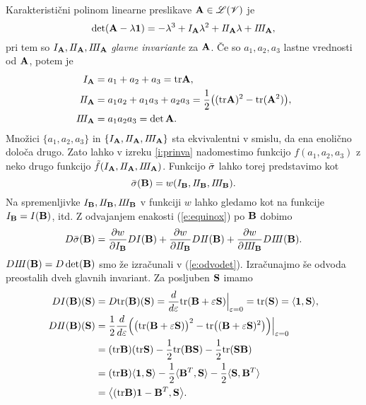 Karakteristični polinom linearne preslikave $\mathbf A\in\mathscr L(\mathscr V)$ je
\[
	\det(\mathbf A-\lambda\mathbf 1)=-\lambda^3+I_{\mathbf A}\lambda^2+I\! I_{\mathbf A}\lambda+I\! I\! I_{\mathbf A},
\]
pri tem so $I_{\mathbf A}, I\! I_{\mathbf A}, I\! I\! I_{\mathbf A}$ \emph{glavne invariante} za $\mathbf A$.
Če so $a_1,a_2,a_3$ lastne vrednosti od $\mathbf A$, potem je
\begin{align*}
	I_{\mathbf A}&=a_1+a_2+a_3=\mathrm{tr}\mathbf A,\\
	I\! I_{\mathbf A}&=a_1a_2+a_1a_3+a_2a_3=\frac{1}{2}\big((\mathrm{tr}\mathbf A)^2-\mathrm{tr}(\mathbf A^2)\big),\\
	I\! I\! I_{\mathbf A}&=a_1a_2a_3=\det\mathbf A.
\end{align*}
Množici $\{a_1,a_2,a_3\}$ in $\{I_{\mathbf A},I\! I_{\mathbf A},I\! I\! I_{\mathbf A}\}$ sta ekvivalentni
v smislu, da ena enoli\-čno določa drugo. Zato lahko v izreku \ref{i:prinva} nadomestimo
funkcijo $f(a_1,a_2,a_3)$ z neko drugo funkcijo $\tilde{f}(I_{\mathbf A},I\! I_{\mathbf A},I\! I\! I_{\mathbf A})$.
Funkcijo $\bar{\sigma}$ lahko torej predstavimo kot
\begin{equation} \label{e:equinox}
	\bar{\sigma}(\mathbf B)=w(I_{\mathbf B},I\! I_{\mathbf B},I\! I\! I_{\mathbf B}).
\end{equation}
Na spremenljivke $I_{\mathbf B},I\! I_{\mathbf B},I\! I\! I_{\mathbf B}$ v funkciji $w$ lahko gledamo kot
na funkcije $I_{\mathbf B}=I(\mathbf B)$, itd. Z odvajanjem enakosti (\ref{e:equinox}) po $\mathbf B$ dobimo
\begin{equation} \label{e:dbshy}
	D\bar{\sigma}(\mathbf B)=\frac{\partial w}{\partial I_{\mathbf B}}DI(\mathbf B)+
	\frac{\partial w}{\partial I\! I_{\mathbf B}}DI\! I(\mathbf B)+
	\frac{\partial w}{\partial I\! I\! I_{\mathbf B}}DI\! I\! I(\mathbf B).
\end{equation}
$DI\! I\! I(\mathbf B)=D\det(\mathbf B)$ smo že izračunali v (\ref{e:odvodet}). Izračunajmo še
odvoda preostalih dveh glavnih invariant. Za posljuben $\mathbf S$ imamo
\begin{align*}
	DI(\mathbf B)(\mathbf S)&=D\mathrm{tr}(\mathbf B)(\mathbf S)=
	\frac{d}{d\varepsilon}\mathrm{tr}(\mathbf B+\varepsilon\mathbf S)\Big|_{\varepsilon=0}=
	\mathrm{tr}(\mathbf S)=\langle\mathbf 1,\mathbf S\rangle,\\
	DI\! I(\mathbf B)(\mathbf S)&=
	\frac{1}{2}\frac{d}{d\varepsilon}\Big(
	\big(\mathrm{tr}(\mathbf B+\varepsilon\mathbf S)\big)^2-\mathrm{tr}\big((\mathbf B+\varepsilon\mathbf S)^2\big)
	\Big)\Big|_{\varepsilon=0}\\
	&=(\mathrm{tr}\mathbf B)(\mathrm{tr}\mathbf S)-\frac{1}{2}\mathrm{tr}(\mathbf B\mathbf S)-\frac{1}{2}\mathrm{tr}(\mathbf S\mathbf B)\\
	&=(\mathrm{tr}\mathbf B)\langle\mathbf 1,\mathbf S\rangle-\frac{1}{2}\langle\mathbf B^T,\mathbf S\rangle
	-\frac{1}{2}\langle\mathbf S,\mathbf B^T\rangle\\
	&=\big<(\mathrm{tr}\mathbf B)\mathbf 1-\mathbf B^T,\mathbf S\big>.
\end{align*}
